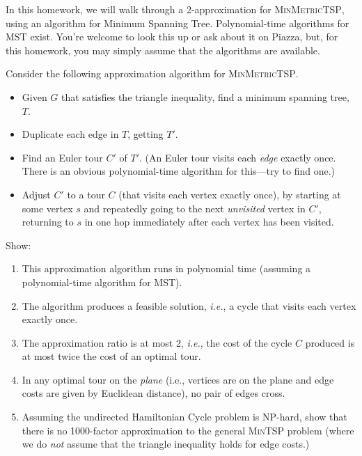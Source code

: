\documentclass[2pt,legalpaper]{scrartcl}
\begin{document}
\begin{multicols}{6}
{In this homework, we will walk through a 2-approximation for
\textsc{MinMetricTSP}, using an algorithm for Minimum Spanning Tree.
Polynomial-time algorithms for \textsc{MST} exist.  You're welcome to
look this up or ask about it on Piazza, but, for this homework, you
may simply assume that the algorithms are available.

Consider the following approximation algorithm for \textsc{MinMetricTSP}.

\begin{itemize}
\item Given $G$ that satisfies the triangle inequality, find a minimum
  spanning tree, $T$.
\item Duplicate each edge in $T$, getting $T'$.
\item Find an Euler tour $C'$ of $T'$.  (An Euler tour visits each
  {\em edge} exactly once.  There is an obvious polynomial-time
  algorithm for this---try to find one.)
\item Adjust $C'$ to a tour $C$ (that visits each vertex exactly
  once), by starting at some vertex $s$ and repeatedly going to the next
  {\em unvisited} vertex in $C'$, returning to $s$ in one hop
  immediately after each vertex has been visited.
\end{itemize}

Show:
\begin{enumerate}
\item This approximation algorithm runs in polynomial time (assuming a
  polynomial-time algorithm for \textsc{MST}).
\item The algorithm produces a feasible solution, {\em i.e.}, a cycle
  that visits each vertex exactly once.
\item The approximation ratio is at most 2, {\em i.e.}, the cost of
  the cycle $C$ produced is at most twice the cost of an optimal tour.
\item In any optimal tour on the {\em plane} (i.e., vertices are on
  the plane and edge costs are given by Euclidean distance), no pair
  of edges cross.
\item Assuming the undirected Hamiltonian Cycle problem is NP-hard,
  show that there is no 1000-factor approximation to the general
  \textsc{MinTSP} problem (where we do {\em not} assume that the
  triangle inequality holds for edge costs.)
\end{enumerate}

}
\end{multicols}
\end{document}
